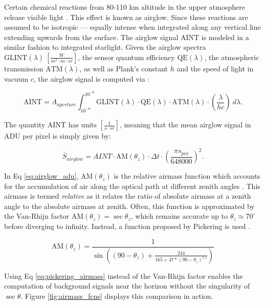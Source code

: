 Certain chemical reactions from 80-110 km altitude in the upper atmosphere release visible light
\cite{krag2003}. This effect is known as
airglow. Since these reactions are assumed to be isotropic ---  equally intense when integrated along any
vertical line extending upwards from the surface. The airglow signal $\textrm{AINT}$ is modeled in a
similar fashion to integrated starlight. Given the airglow spectra $\textrm{GLINT}(\lambda) \:
\left[ \frac{W}{m^2\cdot m \cdot sr} \right]$, the sensor quantum efficiency $\textrm{QE}(\lambda)$, the atmospheric transmission $\textrm{ATM}(\lambda)$, as well as Plank's constant $h$ and the speed of light in vacuum $c$, the airglow signal is computed via \cite{krag2003}:

\begin{equation} \label{eq:aint}
 \textrm{AINT} = A_{aperture}
  \int_{10^{-8}}^{10^{-6}}{ \textrm{GLINT}(\lambda) \cdot \textrm{QE}(\lambda) \cdot \textrm{ATM}(\lambda)
  \cdot \left( \frac{\lambda}{h c} \right) \: d\lambda}.
\end{equation}

The quantity $\textrm{AINT}$ has units $\left[ \frac{1}{s\cdot sr} \right]$, meaning that the
mean airglow signal in ADU per pixel is simply given by:

\begin{equation} \label{eq:airglow_adu}
  \bar{S}_{airglow} = AINT \cdot \textrm{AM}(\theta_z) \cdot \Delta t \cdot \left( \frac{\pi s_{pix}}{648000} \right)^2.
\end{equation}

In Eq \ref{eq:airglow_adu}, $\textrm{AM}(\theta_z)$ is the relative airmass function which accounts for the accumulation of air along the optical path at different zenith angles \cite{frueh2019notes}. This airmass is termed \textit{relative} as it relates the ratio of absolute airmass at a zenith angle to the absolute airmass at zenith. Often, this function is approximated by the Van-Rhijn factor $\textrm{AM}(\theta_z) = \sec{\theta_z}$, which remains accurate up to $\theta_z \approx 70^\circ$ before diverging to infinity. Instead, a function proposed by Pickering is used \cite{pickering2002}.

\begin{equation} \label{eq:pickering_airmass}
  \textrm{AM}(\theta_z) = \frac{1}{\sin\left((90 - \theta_z) +  \frac{244}{165 + 47 * \left(90 - \theta_z \right)^{1.1}}\right)}
\end{equation}


Using Eq \ref{eq:pickering_airmass} instead of the Van-Rhijn factor enables the computation of background signals near the horizon without the singularity of $\sec{\theta}$. Figure \ref{fig:airmass_fcns} displays this comparison in action.

